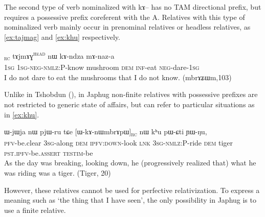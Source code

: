 \documentclass[oldfontcommands,oneside,a4paper,11pt]{article}
\newcommand{\ipa}[1]{{\phon #1}} %
\newcommand{\topic}{\textsc{dem}}
\newcommand{\tete}{\textsuperscript{\textsc{head}}}
\newcommand{\rc}{\textsubscript{\textsc{rc}}}
\begin{document}
The second type of verb nominalized with \ipa{kɤ}-- has no TAM directional prefix, but requires a possessive prefix coreferent with the A. Relatives with this type of nominalized verb mainly occur in prenominal relatives or headless relatives, as \ref{ex:tajmag} and \ref{ex:khu} respectively.

     \begin{exe}
   \ex \label{ex:tajmag}
   \gll
[\ipa{aʑo}  	\ipa{a-mɤ-kɤ-sɯz}]\rc{}  	\ipa{tɤjmɤɣ}\tete{}  	\ipa{nɯ}  	\ipa{kɤ-ndza}  	\ipa{mɤ-naz-a}  \\
\textsc{1sg} \textsc{1sg-neg-nmlz:P}-know mushroom \textsc{dem} \textsc{inf}-eat \textsc{neg}-dare-\textsc{1sg} \\
\glt I do not dare to eat the mushrooms that I do not know. (mbrɤʑɯm,103)
\end{exe}
 

  


Unlike in Tshobdun (\citealt[10]{jacksonlin07}), in Japhug non-finite relatives with possessive prefixes are not restricted to generic state of affairs, but can refer to particular situations as in \ref{ex:khu}.


     \begin{exe}
   \ex \label{ex:khu}
   \gll  \ipa{lɤ-fsoʁ}  	\ipa{ɯ-jɯja}  	\ipa{nɯ}  	\ipa{pjɯ-ru}  	\ipa{tɕe}  	[\ipa{ɯ-kɤ-nɯmbrɤpɯ}]\rc{}  	\ipa{nɯ}  	\ipa{kʰu}  	\ipa{pɯ-ɕti}  	\ipa{ɲɯ-ŋu,}  \\
\textsc{pfv}-be.clear    \textsc{3sg}-along  \textsc{dem} \textsc{ipfv:down}-look \textsc{lnk} \textsc{3sg-nmlz:P}-ride \topic{} tiger \textsc{pst.ipfv}-be.\textsc{assert}  \textsc{testim}-be \\
\glt As the day was breaking, looking down, he (progressively realized that) what he was riding was a tiger. (Tiger, 20)
\end{exe}

However, these relatives cannot be used for perfective relativization. To express a meaning such as `the thing that I have  seen', the only possibility in Japhug is to use a finite relative.
\end{document}
